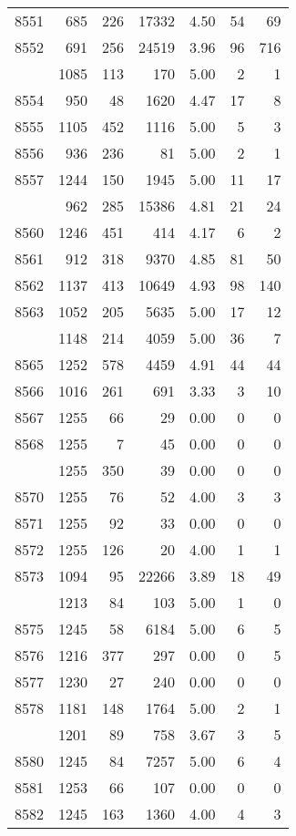 \documentclass[
]{article}
\begin{document}
\begin{table}
\begin{tabular}[t]{lrrrrrr}
8551 & 685 & 226 & 17332 & 4.50 & 54 & 69\\
8552 & 691 & 256 & 24519 & 3.96 & 96 & 716\\
\addlinespace
8553 & 1085 & 113 & 170 & 5.00 & 2 & 1\\
8554 & 950 & 48 & 1620 & 4.47 & 17 & 8\\
8555 & 1105 & 452 & 1116 & 5.00 & 5 & 3\\
8556 & 936 & 236 & 81 & 5.00 & 2 & 1\\
8557 & 1244 & 150 & 1945 & 5.00 & 11 & 17\\
\addlinespace
8559 & 962 & 285 & 15386 & 4.81 & 21 & 24\\
8560 & 1246 & 451 & 414 & 4.17 & 6 & 2\\
8561 & 912 & 318 & 9370 & 4.85 & 81 & 50\\
8562 & 1137 & 413 & 10649 & 4.93 & 98 & 140\\
8563 & 1052 & 205 & 5635 & 5.00 & 17 & 12\\
\addlinespace
8564 & 1148 & 214 & 4059 & 5.00 & 36 & 7\\
8565 & 1252 & 578 & 4459 & 4.91 & 44 & 44\\
8566 & 1016 & 261 & 691 & 3.33 & 3 & 10\\
8567 & 1255 & 66 & 29 & 0.00 & 0 & 0\\
8568 & 1255 & 7 & 45 & 0.00 & 0 & 0\\
\addlinespace
8569 & 1255 & 350 & 39 & 0.00 & 0 & 0\\
8570 & 1255 & 76 & 52 & 4.00 & 3 & 3\\
8571 & 1255 & 92 & 33 & 0.00 & 0 & 0\\
8572 & 1255 & 126 & 20 & 4.00 & 1 & 1\\
8573 & 1094 & 95 & 22266 & 3.89 & 18 & 49\\
\addlinespace
8574 & 1213 & 84 & 103 & 5.00 & 1 & 0\\
8575 & 1245 & 58 & 6184 & 5.00 & 6 & 5\\
8576 & 1216 & 377 & 297 & 0.00 & 0 & 5\\
8577 & 1230 & 27 & 240 & 0.00 & 0 & 0\\
8578 & 1181 & 148 & 1764 & 5.00 & 2 & 1\\
\addlinespace
8579 & 1201 & 89 & 758 & 3.67 & 3 & 5\\
8580 & 1245 & 84 & 7257 & 5.00 & 6 & 4\\
8581 & 1253 & 66 & 107 & 0.00 & 0 & 0\\
8582 & 1245 & 163 & 1360 & 4.00 & 4 & 3\\

\end{tabular}
\end{table}
\end{document}
